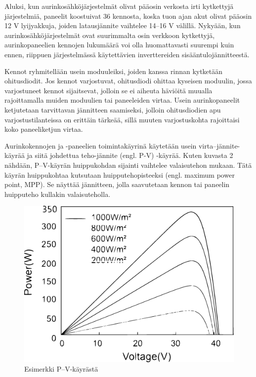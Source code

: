   Aluksi, kun aurinkosähköjärjestelmät olivat pääosin verkosta irti kytkettyjä järjestelmiä, paneelit koostuivat 36 kennosta, koska tuon ajan akut olivat pääosin 12 V lyijyakkuja, joiden latausjännite vaihtelee 14–16 V välillä. Nykyään, kun aurinkosähköjärjestelmät ovat suurimmalta osin verkkoon kytkettyjä, aurinkopaneelien kennojen lukumäärä voi olla huomattavasti suurempi kuin ennen, riippuen järjestelmässä käytettävien inverttereiden sisääntulojännitteestä. \parencite{Messenger}

  Kennot ryhmitellään usein moduuleiksi, joiden kanssa rinnan kytketään ohitusdiodit. Jos kennot varjostuvat, ohitusdiodi ohittaa kyseisen moduulin, jossa varjostuneet kennot sijaitsevat, jolloin se ei aiheuta häviöitä muualla rajoittamalla muiden moduulien tai paneeleiden virtaa. Usein aurinkopaneelit ketjutetaan tarvittavan jännitteen saamiseksi, jolloin ohitusdiodien apu varjostustilanteissa on erittäin tärkeää, sillä muuten varjostuskohta rajoittaisi koko paneeliketjun virtaa. \parencite{Willeke&Weber}

  Aurinkokennojen ja -paneelien toimintakäyrinä käytetään usein virta--jännite-käyrää ja siitä johdettua teho-jännite (engl. P-V) -käyrää. Kuten kuvasta 2 nähdään, P--V-käyrän huippukohdan sijainti vaihtelee valaisutehon mukaan. Tätä käyrän huippukohtaa kutsutaan huipputehopisteeksi (engl. maximum power point, MPP). Se näyttää jännitteen, jolla saavutetaan kennon tai paneelin huipputeho kullakin valaisuteholla.
  \begin{figure}
    \centering
    \includegraphics[width=\textwidth]{figures/pvcurve}
    \caption{Esimerkki P--V-käyrästä}
  \end{figure}

